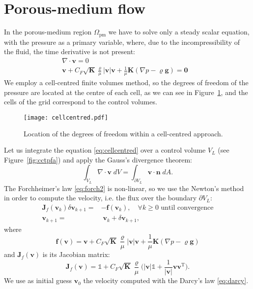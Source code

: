 \section{Porous-medium flow}
In the porous-medium region $\Omega_\text{pm}$ we have to solve only a steady 
scalar equation, with the pressure as a primary variable, where, due to the 
incompressibility of the fluid, the time derivative is not present:
\begin{align}
\label{eq:cellcentred}	\nabla \cdot \mathbf{v} = 0&\\
\label{eq:forch2}	\mathbf{v} + C_F \sqrt{\mathbf{K}} \frac{\varrho}{\mu} 
	|\mathbf{v}|\mathbf{v} + \frac{1}{\mu} \mathbf{K}(\nabla p - \varrho 
	\mathbf{g} ) = \mathbf{0}&
\end{align}
We employ a cell-centred finite volumes method, so the degrees of freedom of 
the pressure are located at the centre of each cell, as we can see in 
Figure~\ref{fig:cellcentred}, and the cells of the grid correspond to the 
control volumes.
\begin{figure}
	\centering
	\texttt{[image: cellcentred.pdf]}
	\caption[Cell-centred grid]{Location of the degrees of freedom within a 
	cell-centred approach.}
	\label{fig:cellcentred}
\end{figure}

Let us integrate the equation \eqref{eq:cellcentred} over a control volume 
$V_L$ (see Figure~\ref{fig:cctpfa}) and apply the Gauss's divergence theorem:
\begin{equation}
\int_{V_L} \nabla \cdot \mathbf{v} \; dV = \int_{\partial V_L} \mathbf{v} \cdot 
\mathbf{n} \; dA.
\end{equation}
The Forchheimer's law \eqref{eq:forch2} is non-linear, so we use the Newton's 
method in order to compute the velocity, i.e. the flux over the boundary 
$\partial V_L$:
\begin{align}
	\mathbf{J}_f(\mathbf{v}_k) \delta \mathbf{v}_{k+1} = &-\mathbf{f}(\mathbf{v}_k), \quad \text{$\forall k\geq 0$ until 
	convergence}\\
	\mathbf{v}_{k+1} = &\;\mathbf{v}_k + \delta \mathbf{v}_{k+1},
\end{align}
where
\begin{equation} \label{eq:resforch}
	\mathbf{f}(\mathbf{v}) = \mathbf{v} + C_F \sqrt{\mathbf{K}} 
	\frac{\varrho}{\mu} 
	|\mathbf{v}|\mathbf{v} + \frac{1}{\mu} \mathbf{K}(\nabla p - \varrho 
	\mathbf{g} )
\end{equation}
and $\mathbf{J}_f(\mathbf{v})$ is its Jacobian matrix:
\begin{equation} \label{eq:jacforch}
\mathbf{J}_f(\mathbf{v}) = \mathbb{1} + 
C_F\sqrt{\mathbf{K}}\frac{\varrho}{\mu}\big(|\mathbf{v}|\mathbb{1} + 
\frac{1}{|\mathbf{v}|}{\mathbf{v}\mathbf{v}^\mathrm{T}}\big).
\end{equation}
We use as initial guess $\mathbf{v}_0$ the velocity computed with the Darcy's 
law \eqref{eq:darcy}.


